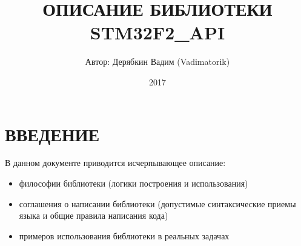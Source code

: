 \documentclass[a4paper, 12pt]{report}		%
\begin{document}
	\title {ОПИСАНИЕ БИБЛИОТЕКИ STM32F2\_API}
	\author {Автор: Дерябкин Вадим (Vadimatorik)}
	\date {2017}
	\maketitle
	
	\chapter{ВВЕДЕНИЕ}
	В данном документе приводится исчерпывающее описание:
	\begin{itemize}
		\item философии библиотеки (логики построения и использования)
		\item соглашения о написании библиотеки (допустимые синтаксические приемы языка и общие правила написания кода)
		\item примеров использования библиотеки в реальных задачах
	\end{itemize}

	\tableofcontents
	\clearpage							%
	
	
	
\end{document}
